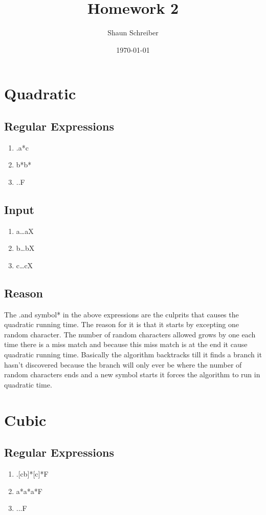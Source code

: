 \documentclass[a4paper, 1pt]{article}
\title{Homework 2}
\author{Shaun Schreiber}
\date{\today}
\newcommand{\plus}{\raisebox{.4ex}{\small{+}}}
\begin{document}
\maketitle
\section{Quadratic}
\subsection{Regular Expressions}
\begin{enumerate}
\item .\plus a*c
\item b*b*
\item .\plus .\plus F
\end{enumerate}
\subsection{Input}
\begin{enumerate}
\item a\dots aX
\item b\dots bX
\item c\dots cX
\end{enumerate}
\subsection{Reason}
The .\plus and symbol* in the above expressions are the culprits that
causes the quadratic running time. The reason for it is that it starts by excepting one random character. The number of random characters allowed grows by one each time there is a miss match and because this miss match is at the end it cause quadratic running time. Basically the algorithm backtracks till it finds a branch it hasn't discovered because the branch will only ever be where the number of random characters ends and a new symbol starts it forces the algorithm to run in quadratic time.
\section{Cubic}
\subsection{Regular Expressions}
\begin{enumerate}
\item .\plus [cb]*[c]*F
\item a*a*a*F
\item .\plus .\plus .\plus F
\end{enumerate}
\end{document}
